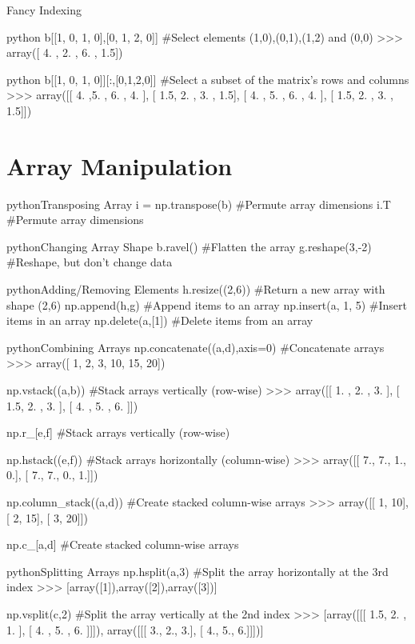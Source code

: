 \begin{myblock}{Fancy Indexing}
\begin{codebox}{python}{}
b[[1, 0, 1, 0],[0, 1, 2, 0]]  #Select elements (1,0),(0,1),(1,2) and (0,0)
>>> array([ 4. , 2. , 6. , 1.5])
\end{codebox}
\begin{codebox}{python}{}
b[[1, 0, 1, 0]][:,[0,1,2,0]]  #Select a subset of the matrix’s rows and columns
>>> array([[ 4. ,5. , 6. , 4. ],
           [ 1.5, 2. , 3. , 1.5],
           [ 4. , 5. , 6. , 4. ],
           [ 1.5, 2. , 3. , 1.5]])
\end{codebox}
\end{myblock}


\section{Array Manipulation}

\begin{codebox}{python}{Transposing Array}
i = np.transpose(b)  #Permute array dimensions
i.T  #Permute array dimensions
\end{codebox}

\begin{codebox}{python}{Changing Array Shape}
b.ravel()  #Flatten the array
g.reshape(3,-2)  #Reshape, but don’t change data
\end{codebox}

\begin{codebox}{python}{Adding/Removing Elements}
h.resize((2,6))  #Return a new array with shape (2,6)
np.append(h,g)  #Append items to an array
np.insert(a, 1, 5)  #Insert items in an array
np.delete(a,[1])  #Delete items from an array
\end{codebox}

\begin{codebox}{python}{Combining Arrays}
np.concatenate((a,d),axis=0)  #Concatenate arrays
>>> array([ 1, 2, 3, 10, 15, 20])

np.vstack((a,b))  #Stack arrays vertically (row-wise)
>>> array([[ 1. , 2. , 3. ],
           [ 1.5, 2. , 3. ],
           [ 4. , 5. , 6. ]])

np.r_[e,f]  #Stack arrays vertically (row-wise)

np.hstack((e,f))  #Stack arrays horizontally (column-wise)
>>> array([[ 7., 7., 1., 0.],
           [ 7., 7., 0., 1.]])

np.column_stack((a,d))  #Create stacked column-wise arrays
>>> array([[ 1, 10],
           [ 2, 15],
           [ 3, 20]])

np.c_[a,d]  #Create stacked column-wise arrays
\end{codebox}

\begin{codebox}{python}{Splitting Arrays}
np.hsplit(a,3)  #Split the array horizontally at the 3rd index
>>> [array([1]),array([2]),array([3])]

np.vsplit(c,2)  #Split the array vertically at the 2nd index
>>> [array([[[ 1.5, 2. , 1. ], [ 4. , 5. , 6. ]]]),
     array([[[ 3., 2., 3.], [ 4., 5., 6.]]])]
\end{codebox}
